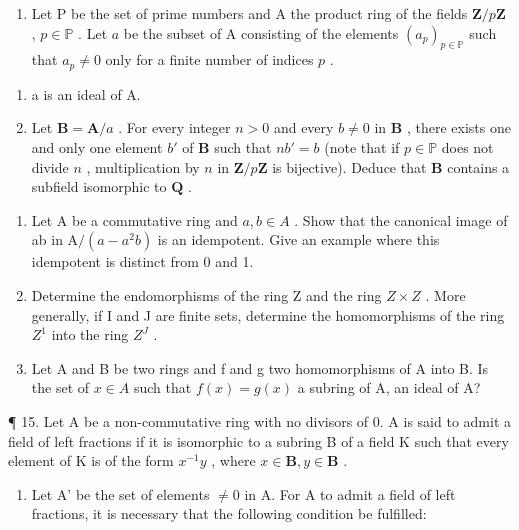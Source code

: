 \begin{enumerate}
\def\labelenumi{\arabic{enumi}.}
\setcounter{enumi}{10}
\tightlist
\item
  Let P be the set of prime numbers and A the product ring of the fields \(\mathbf{Z} / p\mathbf{Z}\) , \(p \in \mathbb{P}\) . Let \(a\) be the subset of A consisting of the elements \((a_p)_{p \in \mathbb{P}}\) such that \(a_p \neq 0\) only for a finite number of indices \(p\) .
\end{enumerate}

\begin{enumerate}
\def\labelenumi{(\alph{enumi})}
\item
  a is an ideal of A.
\item
  Let \(\mathbf{B} = \mathbf{A} / a\) . For every integer \(n > 0\) and every \(b \neq 0\) in \(\mathbf{B}\) , there exists one and only one element \(b'\) of \(\mathbf{B}\) such that \(nb' = b\) (note that if \(p \in \mathbb{P}\) does not divide \(n\) , multiplication by \(n\) in \(\mathbf{Z} / p\mathbf{Z}\) is bijective). Deduce that \(\mathbf{B}\) contains a subfield isomorphic to \(\mathbf{Q}\) .
\end{enumerate}

\begin{enumerate}
\def\labelenumi{\arabic{enumi}.}
\setcounter{enumi}{11}
\item
  Let A be a commutative ring and \(a, b \in A\) . Show that the canonical image of ab in \(\mathrm{A}/(a - a^{2}b)\) is an idempotent. Give an example where this idempotent is distinct from 0 and 1.
\item
  Determine the endomorphisms of the ring Z and the ring \(Z \times Z\) . More generally, if I and J are finite sets, determine the homomorphisms of the ring \(Z^{1}\) into the ring \(Z^{J}\) .
\item
  Let A and B be two rings and f and g two homomorphisms of A into B. Is the set of \(x \in A\) such that \(f(x) = g(x)\) a subring of A, an ideal of A?
\end{enumerate}

¶ 15. Let A be a non-commutative ring with no divisors of 0. A is said to admit a field of left fractions if it is isomorphic to a subring B of a field K such that every element of K is of the form \(x^{-1}y\) , where \(x \in \mathbf{B}, y \in \mathbf{B}\) .

\begin{enumerate}
\def\labelenumi{(\alph{enumi})}
\tightlist
\item
  Let A' be the set of elements \(\neq0\) in A. For A to admit a field of left fractions, it is necessary that the following condition be fulfilled:
\end{enumerate}

